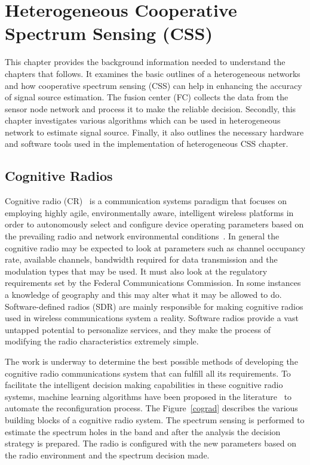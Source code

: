 \chapter{Heterogeneous Cooperative Spectrum Sensing (CSS)}
\label{chapter3}

This chapter provides the background information needed to understand the chapters that follows. It examines the basic outlines of a heterogeneous networks and how cooperative spectrum sensing (CSS) can help in enhancing the accuracy of signal source estimation. The fusion center (FC) collects the data from the sensor node network and process it to make the reliable decision. Secondly, this chapter investigates various algorithms which can be used in heterogeneous network to estimate signal source. Finally, it also outlines the necessary hardware and software tools used in the implementation of heterogeneous CSS chapter.

\section{Cognitive Radios}
Cognitive radio (CR)~\cite{cogjm} is a communication systems paradigm that focuses on employing highly agile, environmentally aware, intelligent wireless platforms in
order to autonomously select and configure device operating parameters based on the prevailing radio and network environmental conditions~\cite{bookhtn1}. In general the cognitive radio may be expected to look at parameters such as channel occupancy rate, available channels, bandwidth required for data transmission and the modulation types that may be used. It must also look at the regulatory requirements set by the Federal Communications Commission. In some instances a knowledge of geography and this may alter what it may be allowed to do. Software-defined radios (SDR) are mainly responsible for making cognitive radios used in wireless communications system a reality. Software radios provide a vast untapped potential to personalize services, and they make the process of modifying the radio characteristics extremely simple. 

The work is underway to determine the best possible methods of developing the cognitive radio communications system that can fulfill all its requirements. To facilitate the intelligent decision making capabilities in these cognitive radio systems, machine learning algorithms have been proposed in the literature~\cite{barker2008mission,haykin2005cognitive,newman2007cognitive,newman2008population} to automate the reconfiguration process. The Figure~\ref{cograd} describes the various building blocks of a cognitive radio system. The spectrum sensing is performed to estimate the spectrum holes in the band and after the analysis the decision strategy is prepared. The radio is configured with the new parameters based on the radio environment and the spectrum decision made.  

